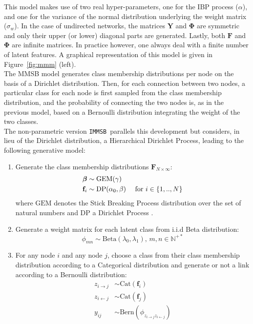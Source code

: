 \documentclass[conference]{IEEEtran}
\renewcommand{\text}{\textnormal}
\newcommand{\imb}{\texttt{IMMSB}}
\newcommand{\gem}{\mathrm{GEM}}
\newcommand{\DP}{\mathrm{DP}}
\newcommand{\mat}[1]{\mathbf{#1}}
\begin{document}
This model makes use of two real hyper-parameters, one for the IBP process ($\alpha$), and one for the variance of the normal distribution underlying the weight matrix ($\sigma_w$). In the case of undirected networks, the matrices $\mat{Y}$ and $\mat{\Phi}$ are symmetric and only their upper (or lower) diagonal parts are generated. Lastly, both $\mat{F}$ and $\mat{\Phi}$ are infinite matrices. In practice however, one always deal with a finite number of latent features. A graphical representation of this model is given in Figure~\ref{fig:mmm} (left).~\\


The MMSB model generates class membership distributions per node on the basis of a Dirichlet distribution. Then, for each connection between two nodes, a particular class for each node is first sampled from the class membership distribution, and the probability of connecting the two nodes is, as in the previous model, based on a Bernoulli distribution integrating the weight of the two classes. 
~\\
The non-parametric version \imb\ parallels this development but considers, in lieu of the Dirichlet distribution, a Hierarchical Dirichlet Process, leading to the following generative model:
%
\begin{enumerate}
\item Generate the class membership distributions $\mat{F}_{N \times \infty}$:
   \begin{align}
       \bm{\beta} &\sim \gem(\gamma) \nonumber \\
    \mat{f}_i &\sim \DP(\alpha_0, \beta) \quad\text{ for }  i \in \{1, .., N\} \nonumber
   \end{align}
where $\gem$ denotes the Stick Breaking Process distribution over the set of natural numbers and $\DP$ a Dirichlet Process  \cite{HDP}.
\item Generate a weight matrix for each latent class from i.i.d Beta distribution:\\
\[ \phi_{mn} \sim \mathrm{Beta}(\lambda_0,\lambda_1), \, m,n \in \mathbb{N}^{+*} \]
\item For any node $i$ and any node $j$, choose a class from their class membership distribution according to a Categorical distribution and generate or not a link according to a Bernoulli distribution:
   \begin{align}
    z_{i \rightarrow j} &\sim \mbox{Cat}(\mat{f}_i) \nonumber \\
    z_{i \leftarrow j} &\sim \mbox{Cat}(\mat{f}_j) \nonumber \\
    y_{ij} &\sim \mathrm{Bern}(\phi_{z_{i \rightarrow j}z_{i \leftarrow j}}) \nonumber
    \label{eq:link-immsb}
   \end{align}
\end{enumerate}
\end{document}
